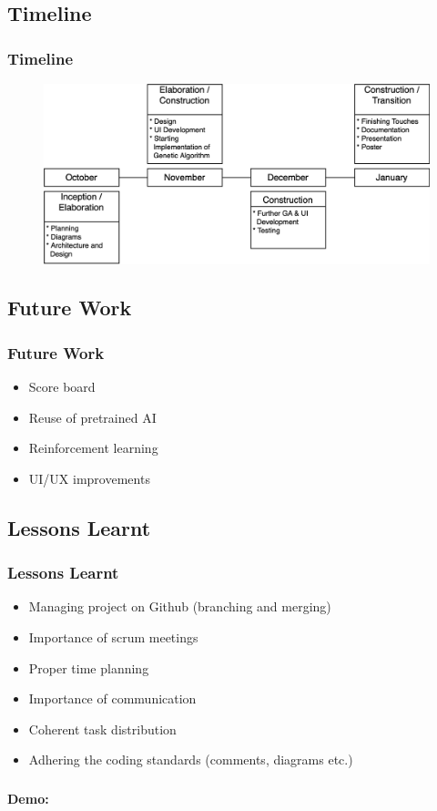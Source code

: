 \documentclass{beamer}
\begin{document}
\subsection{Timeline}

\begin{frame}
    \frametitle{Timeline}
    \begin{figure}\includegraphics[scale=0.3]{resources/timeline.png} 

    \end{figure}

\end{frame}
\subsection{Future Work}
\begin{frame}
    \frametitle{Future Work}
    \begin{itemize}
        \item Score board
        \item Reuse of pretrained AI
        \item Reinforcement learning
        \item UI/UX improvements
    \end{itemize}

\end{frame}

\subsection{Lessons Learnt}
\begin{frame}
   \frametitle{Lessons Learnt}
   \begin{itemize}
       \item Managing project on Github (branching and merging)
       \item Importance of scrum meetings
       \item Proper time planning 
       \item Importance of communication
       \item Coherent task distribution 
       \item Adhering the coding standards (comments, diagrams etc.)
   \end{itemize}

\end{frame}
\begin{frame}
    \frametitle{}
    \centering
    \huge \textbf{Demo:}

\end{frame}
\end{document}
